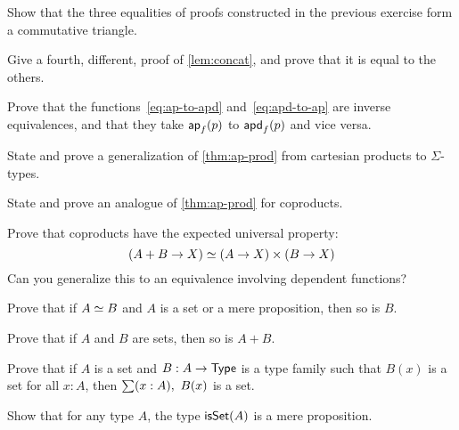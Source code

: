 \begin{ex}
  Show that the three equalities of proofs constructed in the previous exercise form a commutative triangle.
\end{ex}

\begin{ex}
  Give a fourth, different, proof of \autoref{lem:concat}, and prove that it is equal to the others.
\end{ex}

\begin{ex}
  Prove that the functions~\eqref{eq:ap-to-apd} and~\eqref{eq:apd-to-ap} are inverse equivalences, and that they take $\mathsf{ap}_{f}(p)$ to $\mathsf{apd}_{f} (p)$ and vice versa.
\end{ex}

\begin{ex}\label{ex:ap-sigma}
  State and prove a generalization of \autoref{thm:ap-prod} from cartesian products to $\Sigma$-types.
\end{ex}

\begin{ex}
  State and prove an analogue of \autoref{thm:ap-prod} for coproducts.
\end{ex}

\begin{ex}
  Prove that coproducts have the expected universal property:
  \[ (A+B \to X) \simeq (A\to X)\times (B\to X) \]
  Can you generalize this to an equivalence involving dependent functions?
\end{ex}

\begin{ex}
  Prove that if $A \simeq B$ and $A$ is a set or a mere proposition, then so is $B$.
\end{ex}

\begin{ex}\label{ex:isset-coprod}
  Prove that if $A$ and $B$ are sets, then so is $A+B$.
\end{ex}

\begin{ex}\label{ex:isset-sigma}
  Prove that if $A$ is a set and $B:A\to \mathsf{Type}$ is a type family such that $B(x)$ is a set for all $x:A$, then $\sm{x:A} B(x)$ is a set.
\end{ex}


\begin{eg}
  Show that for any type $A$, the type $\mathsf{isSet}(A)$ is a mere proposition.
\end{eg}

